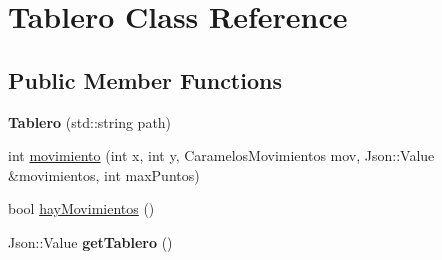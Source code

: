 \hypertarget{classTablero}{\section{Tablero Class Reference}
\label{classTablero}
}
\subsection*{Public Member Functions}
\begin{DoxyCompactItemize}
\item 
\hypertarget{classTablero_a5f82ba1320e689e2868bae2d5690c24f}{{\bfseries Tablero} (std\-::string path)}\label{classTablero_a5f82ba1320e689e2868bae2d5690c24f}

\item 
int \hyperlink{classTablero_af23f2b0dfb3cfcff89faac42b6b12991}{movimiento} (int x, int y, Caramelos\-Movimientos mov, Json\-::\-Value \&movimientos, int max\-Puntos)
\item 
bool \hyperlink{classTablero_a0d7b9f134e3b1a9ae66c64708611b005}{hay\-Movimientos} ()
\item 
\hypertarget{classTablero_ac8b2b7d0ef6fed0147f3aa0c649a02a3}{Json\-::\-Value {\bfseries get\-Tablero} ()}\label{classTablero_ac8b2b7d0ef6fed0147f3aa0c649a02a3}

\end{DoxyCompactItemize}
